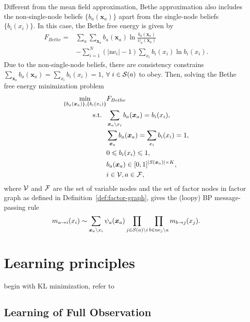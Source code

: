 Different from the mean field approximation, Bethe approximation also includes the non-single-node beliefs $\{b_a(\bm{x}_a)\}$ apart from the single-node beliefs $\{b_i(x_i)\}$\cite{yedidia2003understanding}. In this case, the Bethe free energy is given by
\begin{align}\label{apdix:bethe-free-energy}
  F_{Bethe} = &\sum_{a} \sum_{\bm{x}_a}
                b_a(\bm{x}_a)\ln{\frac{b_a(\bm{x}_a)}{\psi_a(\bm{x}_a)}
                } \nonumber \\
              & -  \sum_{i=1}^{N} (|\mathrm{ne}_i| - 1) \sum_{x_i} b_i(x_i) \ln{b_i(x_i)}.
\end{align}
Due to the  non-single-node beliefs, there are consistency constrains $\sum_{\bm{x}_a} b_a(\bm{x}_a) = \sum_{ x_i} b_i({x}_i) =1$, $\forall~ i \in \mathcal{S}(a)$ to obey. Then, solving the Bethe free energy minimization problem
\begin{align}
  \min_{\{b_a(\bm{x}_a)\}, \{b_i(x_i)\}}& F_{Bethe} \nonumber \\
  \mathrm{s.t.}~~ & \sum_{\bm{x}_a \backslash x_i} b_a(\bm{x}_a)  =
                    b_i(x_i), \nonumber \\
                                      & \sum_{\bm{x}_a} b_a(\bm{x}_a) = \sum_{ x_i} b_i({x}_i) =1,
                                        \nonumber \\
                                      &  0 \leqslant b_i(x_i) \leqslant 1,  \nonumber \\
                                      &  b_a(\bm{x}_a) \in [0,1]^{|S(\bm{x}_a)|\times K}, \nonumber \\
                                      & i \in \mathcal{V} , a \in \mathcal{F},
\end{align}
where $\mathcal{V}$ and $\mathcal{F}$ are the set of variable nodes and the set of
factor nodes in factor graph as defined in
Definition~\ref{def:factor-graph}, gives the (loopy) BP message-passing rule
\begin{equation}
  m_{a\rightarrow i}(x_i) \sim \sum_{\bm{x}_a \backslash x_i}
  \psi_a(\bm{x}_a) \prod_{j \in \mathcal{S}(a) \backslash i} \prod_{b \in \mathrm{ne}_j
    \backslash a} m_{b\rightarrow j}(x_j).
\end{equation}


\section{Learning principles}
begin with KL minimization, refer to \cite[chapter16]{koller2009pgm}

\subsection{Learning of Full Observation}

